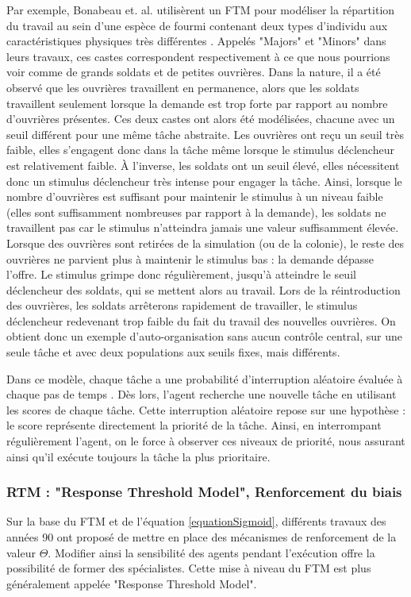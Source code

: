         Par exemple, Bonabeau et. al. \cite{bonabeau_quantitative_1996} utilisèrent un FTM pour modéliser la répartition du travail au sein d'une espèce de fourmi contenant deux types d'individu aux caractéristiques physiques très différentes \cite{wilson_relation_1984}. Appelés "Majors" et "Minors" dans leurs travaux, ces castes correspondent respectivement à ce que nous pourrions voir comme de grands soldats et de petites ouvrières. Dans la nature, il a été observé que les ouvrières travaillent en permanence, alors que les soldats travaillent seulement lorsque la demande est trop forte par rapport au nombre d'ouvrières présentes. Ces deux castes ont alors été modélisées, chacune avec un seuil différent pour une même tâche abstraite. 
        Les ouvrières ont reçu un seuil très faible, elles s'engagent donc dans la tâche même lorsque le stimulus déclencheur est relativement faible. À l'inverse, les soldats ont un seuil élevé, elles nécessitent donc un stimulus déclencheur très intense pour engager la tâche. Ainsi, lorsque le nombre d'ouvrières est suffisant pour maintenir le stimulus à un niveau faible (elles sont suffisamment nombreuses par rapport à la demande), les soldats ne travaillent pas car le stimulus n'atteindra jamais une valeur suffisamment élevée. Lorsque des ouvrières sont retirées de la simulation (ou de la colonie), le reste des ouvrières ne parvient plus à maintenir le stimulus bas : la demande dépasse l'offre. Le stimulus grimpe donc régulièrement, jusqu'à atteindre le seuil déclencheur des soldats, qui se mettent alors au travail. Lors de la réintroduction des ouvrières, les soldats arrêterons rapidement de travailler, le stimulus déclencheur redevenant trop faible du fait du travail des nouvelles ouvrières. On obtient donc un exemple d'auto-organisation sans aucun contrôle central, sur une seule tâche et avec deux populations aux seuils fixes, mais différents.
		
		Dans ce modèle, chaque tâche a une probabilité d'interruption aléatoire évaluée à chaque pas de temps \cite{gautrais_emergent_2002}. Dès lors, l'agent recherche une nouvelle tâche en utilisant les scores de chaque tâche. Cette interruption aléatoire repose sur une hypothèse : le score représente directement la priorité de la tâche. Ainsi, en interrompant régulièrement l'agent, on le force à observer ces niveaux de priorité, nous assurant ainsi qu'il exécute toujours la tâche la plus prioritaire.
        
        \subsubsection{RTM : "Response Threshold Model", Renforcement du biais}
        Sur la base du FTM et de l'équation \ref{equationSigmoid}, différents travaux des années 90 \cite{theraulaz_response_1998,drogoul_multi-agent_1992, gautrais_emergent_2002} ont proposé de mettre en place des mécanismes de renforcement de la valeur $\Theta$. Modifier ainsi la sensibilité des agents pendant l'exécution offre la possibilité de former des spécialistes. Cette mise à niveau du FTM est plus généralement appelée "Response Threshold Model".
        
